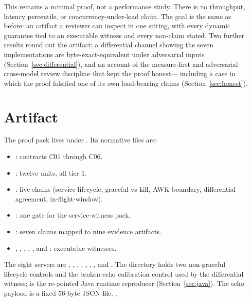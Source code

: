 \documentclass[11pt,letterpaper]{article}
\begin{document}
This remains a minimal proof, not a performance study. There is no
throughput, latency percentile, or concurrency-under-load claim. The
goal is the same as before: an artifact a reviewer can inspect in one
sitting, with every dynamic guarantee tied to an executable witness and
every non-claim stated. Two further results round out the artifact: a
differential channel showing the seven implementations are
byte-exact-equivalent under adversarial inputs
(Section~\ref{sec:differential}), and an account of the measure-first and
adversarial cross-model review discipline that kept the proof honest---
including a case in which the proof falsified one of its own load-bearing
claims (Section~\ref{sec:honest}).

\section{Artifact}

The proof pack lives under . Its
normative files are:

\begin{itemize}
  \item {}: contracts C01 through C06.
  \item {}: twelve units, all tier 1.
  \item {}: five chains (service lifecycle,
        graceful-vs-kill, AWK boundary, differential-agreement, in-flight-window).
  \item {}: one gate for the service-witness pack.
  \item {}: seven claims mapped to nine
        evidence artifacts.
  \item {}, ,
        , ,
        , and
        : executable witnesses.
\end{itemize}

The eight servers are ,
, ,
, ,
, , and
. The  directory holds two
non-graceful lifecycle controls and the broken-echo calibration control
used by the differential witness;  is the
re-pointed Java runtime reproducer (Section~\ref{sec:java}). The echo
payload is a fixed 56-byte JSON file, .
\end{document}
